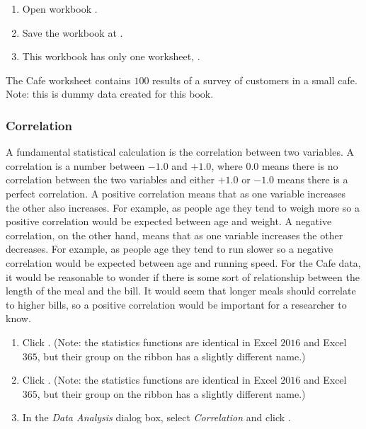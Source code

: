 \begin{enumerate}[resume]	
	\item Open workbook .
	\item Save the workbook at .
	\item This workbook has only one worksheet, .
\end{enumerate}

The Cafe worksheet contains $ 100 $ results of a survey of customers in a small cafe. Note: this is dummy data created for this book.

\subsubsection{Correlation}

A fundamental statistical calculation is the correlation between two variables. A correlation is a number between $ -1.0 $ and $ +1.0 $, where $ 0.0 $ means there is no correlation between the two variables and either $ +1.0 $ or $ -1.0 $ means there is a perfect correlation. A positive correlation means that as one variable increases the other also increases. For example, as people age they tend to weigh more so a positive correlation would be expected between age and weight. A negative correlation, on the other hand, means that as one variable increases the other decreases. For example, as people age they tend to run slower so a negative correlation would be expected between age and running speed. For the Cafe data, it would be reasonable to wonder if there is some sort of relationship between the length of the meal and the bill. It would seem that longer meals should correlate to higher bills, so a positive correlation would be important for a researcher to know.

\begin{enumerate}[resume]
	\item {} Click . (Note: the statistics functions are identical in Excel $ 2016 $ and Excel $ 365 $, but their group on the ribbon has a slightly different name.)
	\item {} Click . (Note: the statistics functions are identical in Excel $ 2016 $ and Excel $ 365 $, but their group on the ribbon has a slightly different name.)
	\item In the \textit{Data Analysis} dialog box, select \textit{Correlation} and click .
\end{enumerate}

